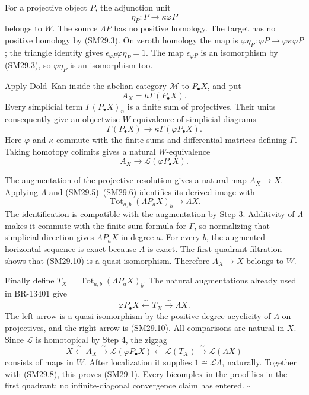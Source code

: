 \documentclass[11pt,a4paper]{article}
\theoremstyle{definition}\newtheorem{definition}[theorem]{Definition}
\theoremstyle{remark}\newtheorem{remark}[theorem]{Remark}
\begin{document}
For a projective object \(P\), the adjunction unit
\[
 \eta_P:P\longrightarrow\kappa\varphi P
\]
belongs to \(W\).  The source \(\Lambda P\) has no positive
homology.  The target has no positive homology by (SM29.3).
On zeroth homology the map is
\(\varphi\eta_P:\varphi P\to\varphi\kappa\varphi P\);
the triangle identity gives
\(\epsilon_{\varphi P}\varphi\eta_P=1\).
The map \(\epsilon_{\varphi P}\) is an isomorphism by
(SM29.3), so \(\varphi\eta_P\) is an isomorphism too.

Apply Dold--Kan inside the abelian category \(\mathcal M\)
to \(P_\bullet X\), and put
\[
 A_X=h\Gamma(P_\bullet X).
\]
Every simplicial term \(\Gamma(P_\bullet X)_n\) is a finite
sum of projectives.  Their units consequently give an
objectwise \(W\)-equivalence of simplicial diagrams
\[
 \Gamma(P_\bullet X)
       \longrightarrow\kappa\Gamma(\varphi P_\bullet X).
\]
Here \(\varphi\) and \(\kappa\) commute with the finite sums
and differential matrices defining \(\Gamma\).
Taking homotopy colimits gives a natural \(W\)-equivalence
\[
 A_X\longrightarrow\mathcal L(\varphi P_\bullet X).
 \tag{SM29.9}
\]

The augmentation of the projective resolution gives a natural
map \(A_X\to X\).  Applying \(\Lambda\) and (SM29.5)--(SM29.6)
identifies its derived image with
\[
 \operatorname{Tot}_{a,b}(\Lambda P_aX)_b
               \longrightarrow\Lambda X.
 \tag{SM29.10}
\]
The identification is compatible with the augmentation by
Step 3.  Additivity of \(\Lambda\) makes it commute with the
finite-sum formula for \(\Gamma\), so normalizing that simplicial
direction gives \(\Lambda P_aX\) in degree \(a\).
For every \(b\), the augmented horizontal sequence
is exact because \(\Lambda\) is exact.
The first-quadrant filtration shows that (SM29.10) is a
quasi-isomorphism.  Therefore \(A_X\to X\) belongs to \(W\).

Finally define
\(T_X=\operatorname{Tot}_{a,b}(\Lambda P_aX)_b\).
The natural augmentations already used in BR-13401 give
\[
 \varphi P_\bullet X
       \xleftarrow{\ \sim\ }T_X
       \xrightarrow{\ \sim\ }\Lambda X.
 \tag{SM29.11}
\]
The left arrow is a quasi-isomorphism by the positive-degree
acyclicity of \(\Lambda\) on projectives, and the right arrow
is (SM29.10).  All comparisons are natural in \(X\).
Since \(\mathcal L\) is homotopical by Step 4, the zigzag
\[
 X\xleftarrow{\ \sim\ }A_X
   \xrightarrow{\ \sim\ }\mathcal L(\varphi P_\bullet X)
   \xleftarrow{\ \sim\ }\mathcal L(T_X)
   \xrightarrow{\ \sim\ }\mathcal L(\Lambda X)
 \tag{SM29.12}
\]
consists of maps in \(W\).
After localization it supplies
\(1\cong\mathcal L\Lambda\), naturally.
Together with (SM29.8), this proves (SM29.1).
Every bicomplex in the proof lies in the first quadrant;
no infinite-diagonal convergence claim has entered.
\(\square\)
\end{document}
